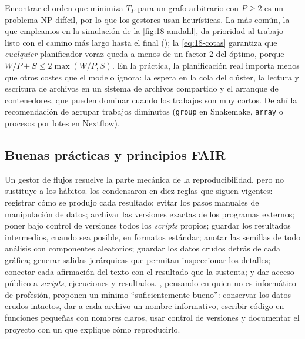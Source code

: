 \begin{profundizacion}
Encontrar el orden que minimiza $T_P$ para un grafo arbitrario con $P\ge2$ es un problema NP-difícil, por lo que los gestores usan heurísticas. La más común, la que empleamos en la simulación de la \cref{fig:18-amdahl}, da prioridad al trabajo listo con el camino más largo hasta el final (); la \cref{eq:18-cotas} garantiza que \emph{cualquier} planificador voraz queda a menos de un factor 2 del óptimo, porque $W/P+S\le 2\max(W/P,S)$. En la práctica, la planificación real importa menos que otros costes que el modelo ignora: la espera en la cola del clúster, la lectura y escritura de archivos en un sistema de archivos compartido y el arranque de contenedores, que pueden dominar cuando los trabajos son muy cortos. De ahí la recomendación de agrupar trabajos diminutos (\texttt{group} en Snakemake, \texttt{array} o procesos por lotes en Nextflow).
\end{profundizacion}

\subsection{Buenas prácticas y principios FAIR}

Un gestor de flujos resuelve la parte mecánica de la reproducibilidad, pero no sustituye a los hábitos. \textcite{c18-sandve2013} los condensaron en diez reglas que siguen vigentes: registrar cómo se produjo cada resultado; evitar los pasos manuales de manipulación de datos; archivar las versiones exactas de los programas externos; poner bajo control de versiones todos los \emph{scripts} propios; guardar los resultados intermedios, cuando sea posible, en formatos estándar; anotar las semillas de todo análisis con componentes aleatorios; guardar los datos crudos detrás de cada gráfica; generar salidas jerárquicas que permitan inspeccionar los detalles; conectar cada afirmación del texto con el resultado que la sustenta; y dar acceso público a \emph{scripts}, ejecuciones y resultados. \textcite{c18-wilson2017}, pensando en quien no es informático de profesión, proponen un mínimo ``suficientemente bueno'': conservar los datos crudos intactos, dar a cada archivo un nombre informativo, escribir código en funciones pequeñas con nombres claros, usar control de versiones y documentar el proyecto con un  que explique cómo reproducirlo.

